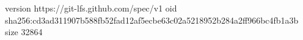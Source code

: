 version https://git-lfs.github.com/spec/v1
oid sha256:cd3ad311907b588fb52fad12af5ecbe63c02a5218952b284a2ff966bc4fb1a3b
size 32864
